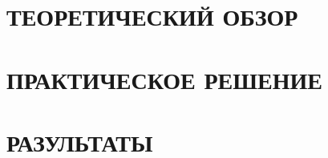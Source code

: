 \documentclass[a4paper,12pt]{extarticle} %
\begin{document}

    

    \tableofcontents{}
    \pagebreak

    \label{sec:introduction}
    

    \newpage
    \section{ТЕОРЕТИЧЕСКИЙ ОБЗОР}
    \label{sec:theory}
    

    \newpage
    \section{ПРАКТИЧЕСКОЕ РЕШЕНИЕ}
    \label{sec:practice}
    

    \newpage
    \section{РАЗУЛЬТАТЫ}
    \label{sec:results}
    

    \newpage
    \label{sec:conclusion}
    

    \newrefcontext[sorting=ntvy]
    \printbibliography[env=gostbibliography, title=Источники литературы]
\end{document}
